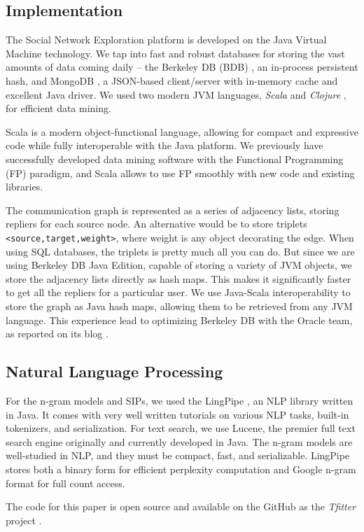 \subsection{Implementation}

The Social Network Exploration platform is developed on the Java Virtual Machine technology.  We tap into fast and robust databases for storing the vast amounts of data coming daily -- the Berkeley DB (BDB) \cite{code:berkeleydb}, an in-process persistent hash, and MongoDB \cite{code:mongodb}, a JSON-based client/server with in-memory cache and excellent Java driver.  We used two modern JVM languages, \emph{Scala} \cite{code:scala} and \emph{Clojure} \cite{code:clojure}, for efficient data mining.

Scala is a modern object-functional language, allowing for compact and expressive code while fully interoperable with the Java platform.  We previously have successfully developed data mining software with the Functional Programming (FP) paradigm, and Scala allows to use FP smoothly with new code and existing libraries.

The communication graph is represented as a series of adjacency lists, storing repliers for each source node.  An alternative would be to store triplets \verb|<source,target,weight>|, where weight is any object decorating the edge.  When using SQL databases, the triplets is pretty much all you can do.  But since we are using Berkeley DB Java Edition, capable of storing a variety of JVM objects, we store the adjacency lists directly as hash maps.  This makes it significantly faster to get all the repliers for a particular user.  We use Java-Scala interoperability to store the graph as Java hash maps, allowing them to be retrieved from any JVM language.  This experience lead to optimizing Berkeley DB with the Oracle team, as reported on its blog \cite{OracleBlog:Khrabrov}.

\subsection{Natural Language Processing}

For the n-gram models and SIPs, we used the LingPipe \cite{code:lingpipe}, an NLP library written in Java.  It comes with very well written tutorials on various NLP tasks, built-in tokenizers, and serialization.  For text search, we use Lucene, the premier full text search engine originally and currently developed in Java.  The n-gram models are well-studied in NLP, and they must be compact, fast, and serializable.  LingPipe stores both a binary form for efficient perplexity computation and Google n-gram format for full count access.

The code for this paper is open source and available on the GitHub as the \emph{Tfitter} project \cite{code:tfitter}.
